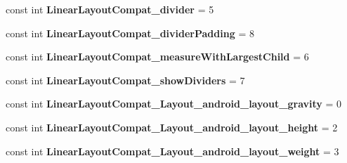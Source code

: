 \begin{DoxyCompactItemize}
\item 
\mbox{\label{class_sample_app_1_1_droid_1_1_resource_1_1_styleable_a6ca2e0554b13803093b7ce12156980d3}} 
const int {\bfseries Linear\+Layout\+Compat\+\_\+divider} = 5
\item 
\mbox{\label{class_sample_app_1_1_droid_1_1_resource_1_1_styleable_a2056efd0a1d100773753c97047e8e6fc}} 
const int {\bfseries Linear\+Layout\+Compat\+\_\+divider\+Padding} = 8
\item 
\mbox{\label{class_sample_app_1_1_droid_1_1_resource_1_1_styleable_ab110e98cf54d4abd42b866eb470a8846}} 
const int {\bfseries Linear\+Layout\+Compat\+\_\+measure\+With\+Largest\+Child} = 6
\item 
\mbox{\label{class_sample_app_1_1_droid_1_1_resource_1_1_styleable_a3ebc40ae1746d7ab57390084ab01d3fd}} 
const int {\bfseries Linear\+Layout\+Compat\+\_\+show\+Dividers} = 7
\item 
\mbox{\label{class_sample_app_1_1_droid_1_1_resource_1_1_styleable_a55a2c76b5df3d7dd0e07a23b13763f1a}} 
const int {\bfseries Linear\+Layout\+Compat\+\_\+\+Layout\+\_\+android\+\_\+layout\+\_\+gravity} = 0
\item 
\mbox{\label{class_sample_app_1_1_droid_1_1_resource_1_1_styleable_adc47ebd62d5ede41a2f06c2556159c66}} 
const int {\bfseries Linear\+Layout\+Compat\+\_\+\+Layout\+\_\+android\+\_\+layout\+\_\+height} = 2
\item 
\mbox{\label{class_sample_app_1_1_droid_1_1_resource_1_1_styleable_a0a8a55aafbfea62ba81a9f17a2c618a0}} 
const int {\bfseries Linear\+Layout\+Compat\+\_\+\+Layout\+\_\+android\+\_\+layout\+\_\+weight} = 3
\item 
\mbox{\label{class_sample_app_1_1_droid_1_1_resource_1_1_styleable_a7109ab4ce99b6aaf4187754dd469aef0}} 

\end{DoxyCompactItemize}
